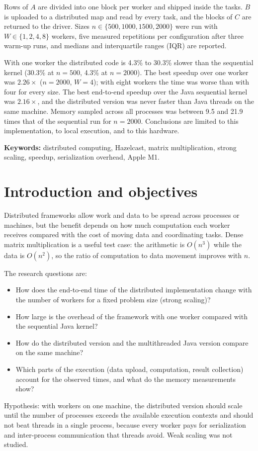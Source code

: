 \documentclass[11pt,a4paper]{article}
\begin{document}
Rows of $A$ are divided into one block per worker and shipped inside the tasks. $B$ is
uploaded to a distributed map and read by every task, and the blocks of $C$ are returned to
the driver. Sizes $n\in\{500,1000,1500,2000\}$ were run with $W\in\{1,2,4,8\}$ workers, five
measured repetitions per configuration after three warm-up runs, and medians and
interquartile ranges (IQR) are reported.

With one worker the distributed code is 4.3\% to 30.3\% slower than the sequential kernel
(30.3\% at $n=500$, 4.3\% at $n=2000$). The best speedup over one worker was $2.26\times$
($n=2000$, $W=4$); with eight workers the time was worse than with four for every size. The
best end-to-end speedup over the Java sequential kernel was $2.16\times$, and the distributed
version was never faster than Java threads on the same machine. Memory sampled across all
processes was between 9.5 and 21.9 times that of the sequential run for $n=2000$. Conclusions
are limited to this implementation, to local execution, and to this hardware.

\textbf{Keywords:} distributed computing, Hazelcast, matrix multiplication, strong scaling,
speedup, serialization overhead, Apple M1.

\section{Introduction and objectives}
Distributed frameworks allow work and data to be spread across processes or machines, but the
benefit depends on how much computation each worker receives compared with the cost of moving
data and coordinating tasks. Dense matrix multiplication is a useful test case: the
arithmetic is $O(n^3)$ while the data is $O(n^2)$, so the ratio of computation to data
movement improves with $n$.

The research questions are:
\begin{itemize}
  \item How does the end-to-end time of the distributed implementation change with the
        number of workers for a fixed problem size (strong scaling)?
  \item How large is the overhead of the framework with one worker compared with the
        sequential Java kernel?
  \item How do the distributed version and the multithreaded Java version compare on the
        same machine?
  \item Which parts of the execution (data upload, computation, result collection) account
        for the observed times, and what do the memory measurements show?
\end{itemize}
Hypothesis: with workers on one machine, the distributed version should scale until the
number of processes exceeds the available execution contexts and should not beat threads in a
single process, because every worker pays for serialization and inter-process communication
that threads avoid. Weak scaling was not studied.
\end{document}
